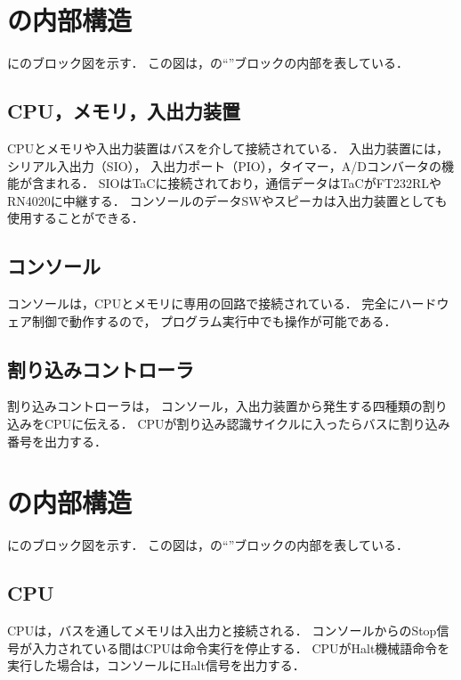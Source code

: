 \section{{\tec}の内部構造}

に{\tec}のブロック図を示す．
この図は，の``{\tec}''ブロックの内部を表している．


\subsection{CPU，メモリ，入出力装置}
CPUとメモリや入出力装置はバスを介して接続されている．
入出力装置には，シリアル入出力（SIO），
入出力ポート（PIO），タイマー，A/Dコンバータの機能が含まれる．
SIOはTaCに接続されており，通信データはTaCがFT232RLやRN4020に中継する．
コンソールのデータSWやスピーカは入出力装置としても使用することができる．

\subsection{コンソール}
コンソールは，CPUとメモリに専用の回路で接続されている．
完全にハードウェア制御で動作するので，
プログラム実行中でも操作が可能である．

\subsection{割り込みコントローラ}
割り込みコントローラは，
コンソール，入出力装置から発生する四種類の割り込みをCPUに伝える．
CPUが割り込み認識サイクルに入ったらバスに割り込み番号を出力する．

\section{{\tac}の内部構造}

に{\tac}のブロック図を示す．
この図は，の``{\tac}''ブロックの内部を表している．


\subsection{CPU}
CPUは，バスを通してメモリは入出力と接続される．
コンソールからのStop信号が入力されている間はCPUは命令実行を停止する．
CPUがHalt機械語命令を実行した場合は，コンソールにHalt信号を出力する．


